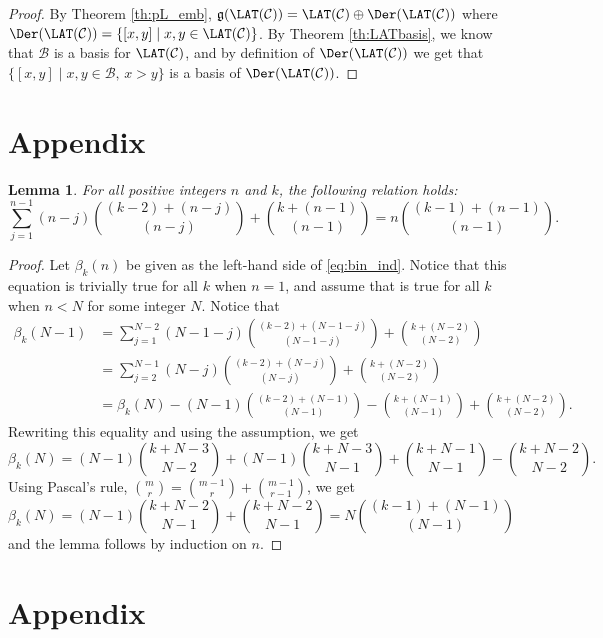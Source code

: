 \documentclass[pdftex]{sigma}
\numberwithin{equation}{section}
\newtheorem{Lemma}[Theorem]{Lemma}
\begin{document}
\begin{proof}
 By Theorem \ref{th:pL_emb}, $\mathfrak{g}(\LAT(\mathcal{C})) = \LAT(\mathcal{C}) \oplus \Der(\LAT(\mathcal{C}))$ where $\Der(\LAT(\mathcal{C})) = \{ [x,y] \mid x,y \in \LAT(\mathcal{C}) \}$. By Theorem \ref{th:LATbasis}, we know that $\mathcal{B}$ is a basis for $\LAT(\mathcal{C})$, and by definition of $\Der(\LAT(\mathcal{C}))$ we get that $\{[x,y] \mid x,y \in \mathcal{B}, \, x>y \}$ is a basis of $\Der(\LAT(\mathcal{C}))$.
\end{proof}

\appendix

\section{Appendix}

\begin{Lemma}\label{lemma:bin_ind}
 For all positive integers $n$ and $k$, the following relation holds:
 \begin{equation}\label{eq:bin_ind}
 \sum_{j=1}^{n-1}(n-j)\binom{(k-2) + (n-j)}{(n-j)} + \binom{k + (n-1)}{(n-1)} = n\binom{(k-1)+(n-1)}{(n-1)}.
 \end{equation}
\end{Lemma}

\begin{proof}
 Let $\beta_k(n)$ be given as the left-hand side of \eqref{eq:bin_ind}. Notice that this equation is trivially true for all $k$ when $n=1$, and assume that is true for all $k$ when $n<N$ for some integer $N$. Notice that
 \begin{align*}
 \beta_k(N-1) &= \sum_{j=1}^{N-2}(N-1-j)\binom{(k-2) + (N-1-j)}{(N-1-j)} + \binom{k + (N-2)}{(N-2)} \\
 &= \sum_{j=2}^{N-1}(N-j)\binom{(k-2) + (N-j)}{(N-j)} + \binom{k + (N-2)}{(N-2)} \\
 &= \beta_k(N) - (N-1)\binom{(k-2)+(N-1)}{(N-1)} - \binom{k + (N-1)}{(N-1)} +\binom{k + (N-2)}{(N-2)}.
 \end{align*}
 Rewriting this equality and using the assumption, we get
 \[
 \beta_k(N) = (N-1)\binom{k +N-3}{N-2} + (N-1)\binom{k +N-3}{N-1} + \binom{k+N-1}{N-1} - \binom{k +N-2}{N-2}.
 \]
 Using Pascal's rule, $\binom{m}{r}= \binom{m-1}{r} + \binom{m-1}{r-1}$, we get
 \[
 \beta_k(N) = (N-1)\binom{k+N-2}{N-1} + \binom{k+N-2}{N-1} = N\binom{(k-1) + (N-1)}{(N-1)}
 \]
 and the lemma follows by induction on $n$.
\end{proof}

\section{Appendix}
\end{document}
